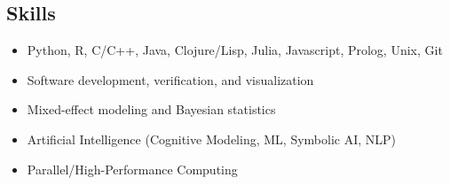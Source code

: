 \documentclass[margin]{res}
\begin{document}
\begin{resume}
  \section{Skills}
  \begin{itemize}
  \item Python, R, C/C++, Java, Clojure/Lisp, Julia, Javascript, Prolog, Unix, Git
  \item Software development, verification, and visualization
  \item Mixed-effect modeling and Bayesian statistics
  \item Artificial Intelligence (Cognitive Modeling, ML, Symbolic AI, NLP)
  \item Parallel/High-Performance Computing
  \end{itemize}
\end{resume}
\end{document}
